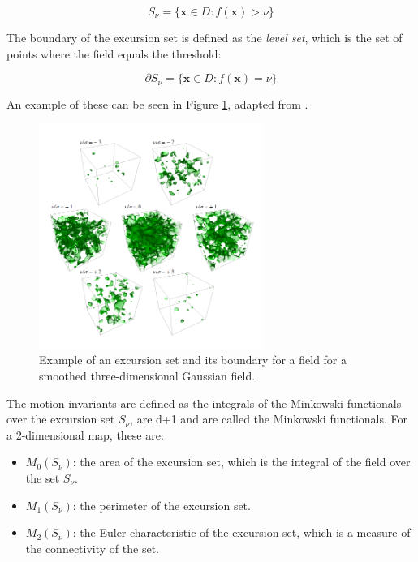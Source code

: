 \begin{equation}
    S_{\nu} = \{ \mathbf{x} \in D : f(\mathbf{x}) > \nu \}
\end{equation}

The boundary of the excursion set is defined as the \textit{level set}, which is the set of points where the field equals the threshold:

\begin{equation}
    \partial S_{\nu} = \{ \mathbf{x} \in D : f(\mathbf{x}) = \nu \}
\end{equation}

An example of these can be seen in Figure \ref{fig:level_set_example}, adapted from \cite{hahnLectures}.

\begin{figure}[t]
    \centering
    \includegraphics[width=0.65\textwidth]{figures/boundaries.png}
    \caption{Example of an excursion set and its boundary for a field for a smoothed three-dimensional Gaussian field.}
    \label{fig:level_set_example}
\end{figure}

The motion-invariants are defined as the integrals of the Minkowski functionals over the excursion set $S_{\nu}$, are d+1 and are called the Minkowski functionals. For a 2-dimensional map, these are:

\begin{itemize}
    \item $M_0(S_{\nu})$: the area of the excursion set, which is the integral of the field over the set $S_{\nu}$.
    \item $M_1(S_{\nu})$: the perimeter of the excursion set.
    \item $M_2(S_{\nu})$: the Euler characteristic of the excursion set, which is a measure of the connectivity of the set.
\end{itemize}

